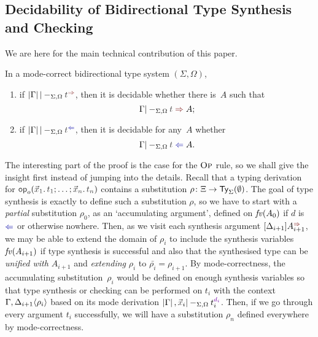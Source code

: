 \subsection{Decidability of Bidirectional Type Synthesis and Checking}\label{subsec:bidirectional-synthesis-checking}

We are here for the main technical contribution of this paper.

\begin{theorem} \label{thm:bidirectional-type-synthesis-checking}
  In a mode-correct bidirectional type system $(\Sigma, \Omega)$,
  \begin{enumerate}
    \item if\/ $\erase{\Gamma} |-_{\Sigma, \Omega} \isTerm{t}^{\syn}$, then it is decidable whether there is~$A$ such that
      \[
        \Gamma |-_{\Sigma, \Omega} \isTerm{t} \syn A;
      \]
    \item if\/ $\erase{\Gamma} |-_{\Sigma, \Omega} \isTerm{t}^{\chk}$, then it is decidable for any~$A$ whether
      \[
        \Gamma |-_{\Sigma, \Omega} \isTerm{t} \chk A.
      \]
  \end{enumerate}
\end{theorem}

The interesting part of the proof is the case for the $\textnormal{\textsc{Op}}$ rule, so we shall give the insight first instead of jumping into the details.
Recall that a typing derivation for $\tmOpts$ contains a substitution $\rho\colon \Xi \to \mathsf{Ty}_{\Sigma}(\emptyset)$.
The goal of type synthesis is exactly to define such a substitution $\rho$, so we have to start with a \emph{partial} substitution $\rho_0$, as an `accumulating argument', defined on $\mathit{fv}(A_0)$ if $d$ is $\chk$ or otherwise nowhere.
Then, as we visit each synthesis argument $\synbiarg[i+1]$, we may be able to extend the domain of $\rho_i$ to include the synthesis variables $\mathit{fv}(A_{i + 1})$ if type synthesis is successful and also that the synthesised type can be \emph{unified with $A_{i+ 1}$} and \emph{extending} $\rho_i$ to $\bar{\rho_i} = \rho_{i+1}$.
By mode-correctness, the accumulating substitution~$\rho_i$ would be defined on enough synthesis variables so that type synthesis or checking can be performed on $t_{i}$ with the context $\Gamma, {\Delta_{i+1}}\!\left<{\rho_i}\right>$ based on its mode derivation $\erase{\Gamma}, \vars{x}_i |-_{\Sigma, \Omega} t_i^{\dir{d_i}}$.
Then, if we go through every argument $t_i$ successfully, we will have a substitution $\rho_n$ defined everywhere by mode-correctness.

